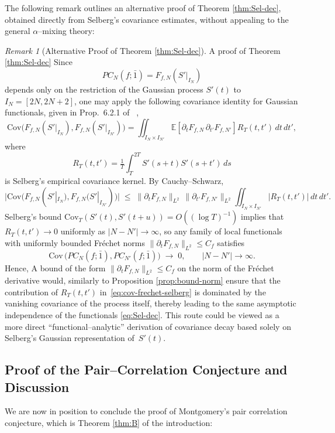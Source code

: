 \documentclass[12pt,reqno]{amsart}
\theoremstyle{plain}
\theoremstyle{definition}
\theoremstyle{remark}
\newtheorem{rem}{Remark}[section]       %
\begin{document}
 The following remark outlines an alternative proof of Theorem \ref{thm:Sel-dec}, obtained directly from Selberg’s covariance estimates, without appealing to the general $\alpha$--mixing theory:
 
\begin{rem}[Alternative Proof of Theorem \ref{thm:Sel-dec}]
\label{rem:Selberg-Frechet} A proof of Theorem \ref{thm:Sel-dec} Since 
\begin{equation}
PC_N(f;\bar{1}) = F_{f,N}(S'|_{I_N})
\end{equation} depends only on the restriction of 
the Gaussian process $S'(t)$ to $I_N=[2N,2N+2]$, 
one may apply the following covariance identity for Gaussian functionals, given in Prop.~6.2.1 of ~\cite{Nualart2006},
\begin{equation}
\label{eq:cov-frechet-selberg}
\mathrm{Cov}\!\bigl(F_{f,N}(S'|_{I_N}),F_{f,N}(S'|_{I_{N'}})\bigr)
=\iint_{I_N\times I_{N'}} 
\!\!\mathbb{E}\!\left[\partial_tF_{f,N}\,\partial_{t'}F_{f,N'}\right] 
R_T(t,t')\,dt\,dt',
\end{equation}
where 
\begin{equation}
R_T(t,t')=\tfrac{1}{T}\!\int_T^{2T}\!S'(s+t)S'(s+t')\,ds
\end{equation}
is Selberg’s empirical covariance kernel.  
By Cauchy–Schwarz,
\begin{equation}
\bigl|\mathrm{Cov}\!\bigl(F_{f,N}(S'|_{I_N}),F_{f,N}(S'|_{I_{N'}})\bigr)\bigr|
\;\le\;
\|\partial_tF_{f,N}\|_{L^2}\,
\|\partial_{t'}F_{f,N'}\|_{L^2}\!
\iint_{I_N\times I_{N'}}\! |R_T(t,t')|\,dt\,dt'.
\end{equation}
Selberg’s bound 
\(
\mathrm{Cov}_T(S'(t),S'(t+u)) = O((\log T)^{-1})
\)
implies that $R_T(t,t')\to 0$ uniformly as $|N-N'|\to\infty$,
so any family of local functionals with uniformly bounded Fréchet norms
$\|\partial_tF_{f,N}\|_{L^2}\le C_f$
satisfies
\begin{equation}
\mathrm{Cov}\, \bigl(PC_N(f;\bar{1}),PC_{N'}(f;\bar{1})\bigr)
\;\longrightarrow\;0,
\qquad |N-N'|\to\infty.
\end{equation}
Hence, A bound of the form
\(
\|\partial_tF_{f,N}\|_{L^2}\le C_f
\) on the norm of the Fréchet derivative would, similarly to Proposition \ref{prop:bound-norm} ensure that the contribution of $R_T(t,t')$ in~\eqref{eq:cov-frechet-selberg} 
is dominated by the vanishing covariance of the process itself, 
thereby leading to the same asymptotic independence of the functionals \eqref{eq:Sel-dec}.
This route could be viewed as a more direct ``functional--analytic'' derivation of covariance decay based solely on Selberg’s Gaussian representation of~$S'(t)$.

\end{rem}\subsection{Proof of the Pair--Correlation Conjecture and Discussion}
\label{ss:9.6} We are now in position to conclude the proof of Montgomery's pair correlation conjecture, which is Theorem \ref{thm:B} of the introduction: 
\end{document}
